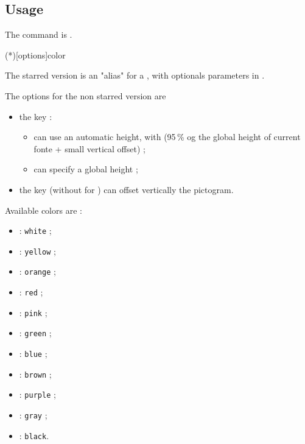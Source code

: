 \documentclass[english,11pt,a4paper]{article}
\begin{document}
\subsection{Usage}

The command is .

\begin{codehigh}[language=latex/latex2,style/main=cyan!10,style/code=cyan!10]
\ColorBelt(*)[options]{color}
\end{codehigh}

The starred version is an "alias" for a , with optionals parameters in \MontreCode{[...]}.

\medskip

The options for the non starred version are

\begin{itemize}[leftmargin=*]
	\item the key  :
	\begin{itemize}
		\item can use an automatic height, with  (95\,\% og the global height of current fonte + small vertical offset) ;
		\item can specify a global height ;
	\end{itemize}
	\item the key  (without  for ) can offset vertically the pictogram.
\end{itemize}

Available colors are :

\begin{itemize}
	\item {} : \texttt{white} ;
	\item {}  : \texttt{yellow} ;
	\item {}  : \texttt{orange} ;
	\item {}  : \texttt{red} ;
	\item {}  : \texttt{pink} ;
	\item {}  : \texttt{green} ;
	\item {}  : \texttt{blue} ;
	\item {}  : \texttt{brown} ;
	\item {}  : \texttt{purple} ;
	\item {}  : \texttt{gray} ;
	\item {}  : \texttt{black}.
\end{itemize}
\end{document}
